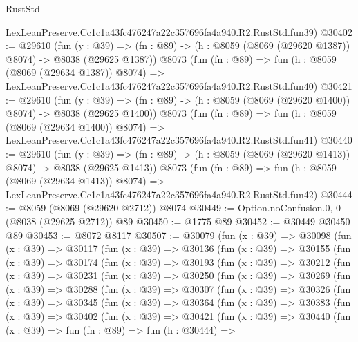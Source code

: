 \begin{lexlean}{RustStd}
\begin{coremodule}
    LexLeanPreserve.Cc1c1a43fc476247a22c357696fa4a940.R2.RustStd.fun39)
@30402 := @29610
    (fun (y : @39) =>
    (fn : @89) -> (h : @8059 (@8069 (@29620 @1387)) @8074) -> @8038 (@29625 @1387))
    @8073
    (fun (fn : @89) =>
    fun (h : @8059 (@8069 (@29634 @1387)) @8074) =>
    LexLeanPreserve.Cc1c1a43fc476247a22c357696fa4a940.R2.RustStd.fun40)
@30421 := @29610
    (fun (y : @39) =>
    (fn : @89) -> (h : @8059 (@8069 (@29620 @1400)) @8074) -> @8038 (@29625 @1400))
    @8073
    (fun (fn : @89) =>
    fun (h : @8059 (@8069 (@29634 @1400)) @8074) =>
    LexLeanPreserve.Cc1c1a43fc476247a22c357696fa4a940.R2.RustStd.fun41)
@30440 := @29610
    (fun (y : @39) =>
    (fn : @89) -> (h : @8059 (@8069 (@29620 @1413)) @8074) -> @8038 (@29625 @1413))
    @8073
    (fun (fn : @89) =>
    fun (h : @8059 (@8069 (@29634 @1413)) @8074) =>
    LexLeanPreserve.Cc1c1a43fc476247a22c357696fa4a940.R2.RustStd.fun42)
@30444 := @8059 (@8069 (@29620 @2712)) @8074
@30449 := Option.noConfusion.{0, 0} (@8038 (@29625 @2712)) @89
@30450 := @1775 @89
@30452 := @30449 @30450 @89
@30453 := @8072 @8117
@30507 := @30079
    (fun (x : @39) =>
    @30098
      (fun (x : @39) =>
      @30117
        (fun (x : @39) =>
        @30136
          (fun (x : @39) =>
          @30155
            (fun (x : @39) =>
            @30174
              (fun (x : @39) =>
              @30193
                (fun (x : @39) =>
                @30212
                  (fun (x : @39) =>
                  @30231
                    (fun (x : @39) =>
                    @30250
                      (fun (x : @39) =>
                      @30269
                        (fun (x : @39) =>
                        @30288
                          (fun (x : @39) =>
                          @30307
                            (fun (x : @39) =>
                            @30326
                              (fun (x : @39) =>
                              @30345
                                (fun (x : @39) =>
                                @30364
                                  (fun (x : @39) =>
                                  @30383
                                    (fun (x : @39) =>
                                    @30402
                                      (fun (x : @39) =>
                                      @30421
                                        (fun (x : @39) =>
                                        @30440
                                          (fun (x : @39) =>
                                          fun (fn : @89) =>
                                          fun (h : @30444) =>

\end{coremodule}
\end{lexlean}
